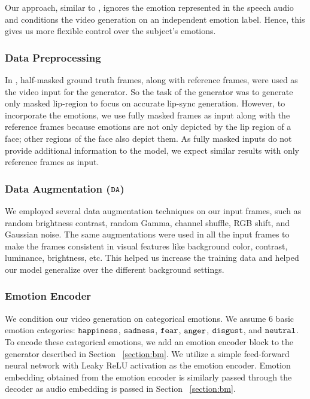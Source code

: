 \documentclass[accepted]{uai2023}
\begin{document}
Our approach, similar to \citep{9496264, Ji_2021_CVPR, sinha2022emotion}, ignores the emotion represented in the speech audio and conditions the video generation on an independent emotion label. Hence, this gives us more flexible control over the subject's emotions.

\subsubsection{Data Preprocessing}
In \citep{prajwal2020lip}, half-masked ground truth frames, along with reference frames, were used as the video input for the generator. So the task of the generator was to generate only masked lip-region to focus on accurate lip-sync generation. However, to incorporate the emotions, we use fully masked frames as input along with the reference frames because emotions are not only depicted by the lip region of a face; other regions of the face also depict them. As fully masked inputs do not provide additional information to the model, we expect similar results with only reference frames as input. 

\subsubsection{Data Augmentation (${\tt DA}$)}
\label{section:da}
We employed several data augmentation techniques on our input frames, such as random brightness contrast, random Gamma, channel shuffle, RGB shift, and Gaussian noise. The same augmentations were used in all the input frames to make the frames consistent in visual features like background color, contrast, luminance, brightness, etc. This helped us increase the training data and helped our model generalize over the different background settings.








\subsubsection{Emotion Encoder}
We condition our video generation on categorical emotions. We assume $6$ basic emotion categories: {${\tt happiness}$},
{${\tt sadness}$}, {${\tt fear}$}, {${\tt anger}$}, {${\tt disgust}$}, and {${\tt neutral}$}. 
To encode these categorical emotions, we add an emotion encoder block to the generator described in Section ~\ref{section:bm}. We utilize a simple feed-forward neural network with Leaky ReLU activation as the emotion encoder. Emotion embedding obtained from the emotion encoder is similarly passed through the decoder as audio embedding is passed in Section ~\ref{section:bm}.
\end{document}
